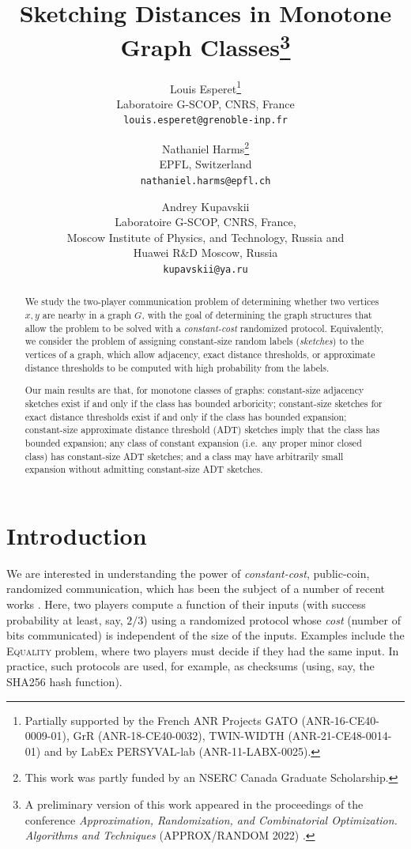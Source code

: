 \documentclass[11pt]{article}
\title{Sketching Distances in Monotone Graph Classes\thanks{A
    preliminary version of this work appeared in the proceedings of
    the conference \emph{Approximation, Randomization, and
      Combinatorial Optimization. Algorithms and Techniques}
    (APPROX/RANDOM 2022) \cite{EHK22}.}}
\author{%
Louis Esperet\thanks{Partially supported by the French ANR Projects
  GATO (ANR-16-CE40-0009-01), GrR (ANR-18-CE40-0032), TWIN-WIDTH
  (ANR-21-CE48-0014-01) and by LabEx
  PERSYVAL-lab (ANR-11-LABX-0025).}\\ Laboratoire G-SCOP, CNRS, France \\ \texttt{louis.esperet@grenoble-inp.fr}
\and
Nathaniel Harms\thanks{This work was partly funded by an NSERC Canada Graduate Scholarship.} \\
EPFL, Switzerland \\
\texttt{nathaniel.harms@epfl.ch}
\and
Andrey Kupavskii \\ Laboratoire G-SCOP, CNRS, France,\\ Moscow Institute of Physics, and Technology, Russia and \\Huawei R\&D Moscow, Russia \\
\texttt{kupavskii@ya.ru}
}
\theoremstyle{definition}
\begin{document}
\maketitle

\begin{abstract}
We study the two-player communication problem of determining whether two vertices $x,y$ are nearby
in a graph $G$, with the goal of determining the graph structures that allow the problem to be
solved with a \emph{constant-cost} randomized protocol. Equivalently, we consider the problem of
assigning constant-size random labels (\emph{sketches}) to the vertices of a graph, which allow adjacency, exact
distance thresholds, or approximate distance thresholds to be computed with high probability from
the labels.

Our main results are that, for monotone classes of graphs: constant-size adjacency sketches exist if
and only if the class has bounded arboricity; constant-size sketches for exact distance thresholds
exist if and only if the class has bounded expansion; constant-size approximate distance threshold
(ADT) sketches imply that the class has bounded expansion; any class of constant expansion (i.e.~any
proper minor closed class) has constant-size ADT sketches; and a class may have arbitrarily small
expansion without admitting constant-size ADT sketches.
\end{abstract}



\thispagestyle{empty}
\setcounter{page}{0}
\newpage

\section{Introduction}\label{sec:intro}

We are interested in understanding the power of \emph{constant-cost}, public-coin, randomized
communication, which has been the subject of a number of recent works
\cite{Har20,HHH21b,HWZ21,CHZZ22,HHM22,HHP+22}. Here,
two players compute a function of their inputs (with success probability at least, say, $2/3$) using
a randomized protocol whose \emph{cost} (number of bits communicated) is independent of the size of
the inputs. Examples include the \textsc{Equality} problem, where two players must decide if they
had the same input. In practice, such protocols are used, for example, as checksums (using, say, the
SHA256 hash function).
\end{document}
